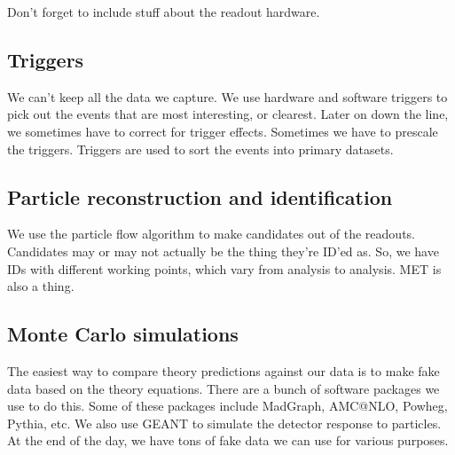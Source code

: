 Don't forget to include stuff about the readout hardware.

\subsection{Triggers} %
\label{ssec:triggers}

We can't keep all the data we capture.
We use hardware and software triggers to pick out the events that are
most interesting, or clearest.
Later on down the line, we sometimes have to correct for trigger effects.
Sometimes we have to prescale the triggers.
Triggers are used to sort the events into primary datasets.

\subsection{Particle reconstruction and identification}
\label{ssec:recoandid}

We use the particle flow algorithm to make candidates out of the readouts.
Candidates may or may not actually be the thing they're ID'ed as.
So, we have IDs with different working points, which vary from analysis to analysis.
MET is also a thing.

\subsection{Monte Carlo simulations}
\label{ssec:montecarlo}

The easiest way to compare theory predictions against our data is to
make fake data based on the theory equations.
There are a bunch of software packages we use to do this.
Some of these packages include MadGraph, AMC@NLO, Powheg, Pythia, etc.
We also use GEANT to simulate the detector response to particles.
At the end of the day, we have tons of fake data we can use for various purposes.

